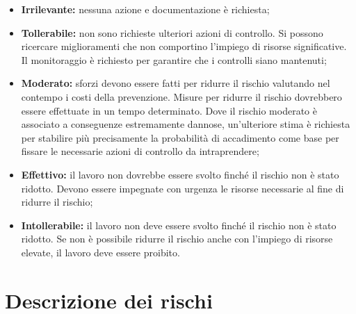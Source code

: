 \begin{itemize}
	\item \textbf{Irrilevante:} nessuna azione e documentazione è richiesta;
	
\item \textbf{Tollerabile:} non sono richieste ulteriori azioni di controllo. Si possono ricercare miglioramenti che non comportino l'impiego di risorse significative. Il monitoraggio è richiesto per garantire che i controlli siano mantenuti;		
	\item \textbf{Moderato:} sforzi devono essere fatti per ridurre il rischio valutando nel contempo i costi della prevenzione. Misure per ridurre il rischio dovrebbero essere effettuate in un tempo determinato. Dove il rischio moderato è associato a conseguenze estremamente dannose, un'ulteriore stima è richiesta per stabilire più precisamente la probabilità di accadimento come base per fissare le necessarie azioni di controllo da intraprendere;
	
\item \textbf{Effettivo:} il lavoro non dovrebbe essere svolto finché il rischio non è stato ridotto. Devono essere impegnate con urgenza le risorse necessarie al fine di ridurre il rischio;
	
\item \textbf{Intollerabile:} il lavoro non deve essere svolto finché il rischio non è stato ridotto. Se non è possibile ridurre il rischio anche con l'impiego di risorse elevate, il lavoro deve essere proibito.
\end{itemize}

\section{Descrizione dei rischi}

